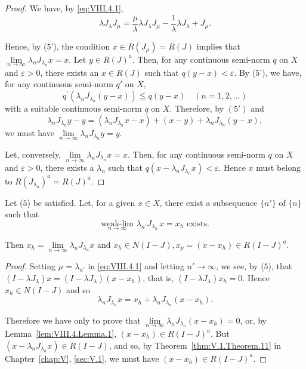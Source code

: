 \begin{proof}
 We have, by \eqref{eq:VIII.4.1}, 
\[
\lambda J _{\lambda} J _{\mu} = \frac {\mu}{\lambda} \lambda J _{\lambda} J _{\mu} - \frac {1}{\lambda} \lambda J _{\lambda} + J _{\mu}. \]

Hence, by ($5$'), the condition $x \in R(J_{\mu}) = R(J)$ implies that $\lim\limits_{n \to \infty} \lambda_n J_{\lambda_n} x = x$. Let $y \in R(J)^a$. Then, for any continuous semi-norm $q$ on $X$ and $\varepsilon > 0$, there exists an $x \in R(J)$ such that $q(y - x) < \varepsilon$. By ($5$'), we have, for any continuous semi-norm $q'$ on $X$, 
\[
q ^{\prime} \left(\lambda_{n} J _ {\lambda_{n}} (y - x)\right) \leqq q (y - x) \quad (n = 1, 2, \dots)
\]
with a suitable continuous semi-norm $q$ on $X$. Therefore, by $(5')$ and 
\[
\lambda_{n} J _ {\lambda_{n}} y - y = \left(\lambda_{n} J _ {\lambda_{n}} x - x\right) + (x - y) + \lambda_{n} J _ {\lambda_{n}} (y - x),
\]
we must have $\lim\limits_{n\to \infty}\lambda_nJ_{\lambda_n}y = y.$ 

Let, conversely, $\lim\limits_{n\to \infty}\lambda_nJ_{\lambda_n}x = x$. Then, for any continuous semi-norm $q$ on $X$ and $\varepsilon >0$, there exists a $\lambda_{n}$ such that $q(x - \lambda_nJ_{\lambda_n}x) < \varepsilon$. Hence $x$ must belong to $R(J_{\lambda_n})^a = R(J)^a$. 
\end{proof}

\begin{theorem}\label{thm:VIII.4.Theorem.2} Let ($5$) be satisfied. Let, for a given $x \in X$, there exist a subsequence $\{n'\}$ of $\{n\}$ such that 
\begin{equation}\label{eq:VIII.4.9}
\underset {n \to \infty} {\text{ weak-lim }} \lambda_ {n ^{\prime}} J _ {\lambda_ {n ^{\prime}}} x = x _{h} \text{ exists. }
\end{equation}
\end{theorem}

Then $x_{h} = \lim\limits_{n\to \infty}\lambda_{n}J_{\lambda_{n}}x$ and $x_{h}\in N(I - J), x_{p} = (x - x_{h})\in R(I - J)^{a}$. 

\begin{proof}
 Setting $\mu = \lambda_{n'}$ in \eqref{eq:VIII.4.1} and letting $n' \to \infty$, we see, by ($5$), that $(I - \lambda J_{\lambda}) x = (I - \lambda J_{\lambda})(x - x_h)$, that is, $(I - \lambda J_{\lambda}) x_h = 0$. Hence $x_h \in N(I - J)$ and so 
\begin{equation}\label{eq:VIII.4.10}
\lambda_{n} J _ {\lambda_{n}} x = x _{h} + \lambda_{n} J _ {\lambda_{n}} (x - x _{h}). \end{equation}

Therefore we have only to prove that $\lim\limits_{n\to \infty}\lambda_nJ_{\lambda_n}(x - x_h) = 0$, or, by Lemma~\ref{lem:VIII.4.Lemma.1}, $(x - x_h)\in R(I - J)^a$. But $(x - \lambda_nJ_{\lambda_n}x)\in R(I - J)$, and so, by Theorem~\ref{thm:V.1.Theorem.11} in Chapter~\ref{chap:V}, \ref{sec:V.1}, we must have $(x - x_h)\in R(I - J)^a$. 
\end{proof}

